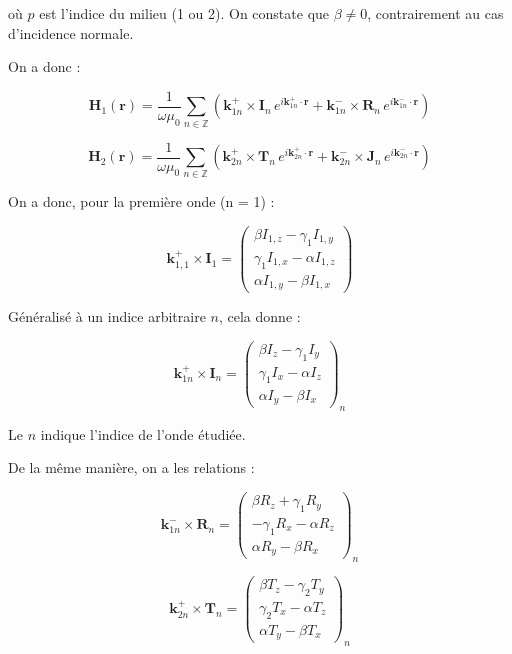 \documentclass{article}
\begin{document}
où $p$ est l'indice du milieu (1 ou 2). On constate que $\beta \neq 0$, contrairement au cas d'incidence normale.


On a donc : 

\[
\mathbf{H}_1(\mathbf{r}) = \frac{1}{\omega \mu_0} \sum_{n \in \mathbb{Z}} 
\left( \mathbf{k}_{1n}^{+} \times \mathbf{I}_n \, e^{i \mathbf{k}_{1n}^{+} \cdot \mathbf{r}} + 
       \mathbf{k}_{1n}^{-} \times \mathbf{R}_n \, e^{i \mathbf{k}_{1n}^{-} \cdot \mathbf{r}} \right)
\]

\[
\mathbf{H}_2(\mathbf{r}) = \frac{1}{\omega \mu_0} \sum_{n \in \mathbb{Z}} 
\left( \mathbf{k}_{2n}^{+} \times \mathbf{T}_n \, e^{i \mathbf{k}_{2n}^{+} \cdot \mathbf{r}} + 
       \mathbf{k}_{2n}^{-} \times \mathbf{J}_n \, e^{i \mathbf{k}_{2n}^{-} \cdot \mathbf{r}} \right)
\]

On a donc, pour la première onde (n = 1) :

\[
\mathbf{k}_{1,1}^{+} \times \mathbf{I}_1 =
\begin{pmatrix}
\beta I_{1,z} - \gamma_1 I_{1,y} \\
\gamma_1 I_{1,x} - \alpha I_{1,z} \\
\alpha I_{1,y} - \beta I_{1,x}
\end{pmatrix}
\]

Généralisé à un indice arbitraire \( n \), cela donne :

\[
\mathbf{k}_{1n}^{+} \times \mathbf{I}_n =
\begin{pmatrix}
\beta I_{z} - \gamma_1 I_{y} \\
\gamma_1 I_{x} - \alpha I_{z} \\
\alpha I_{y} - \beta I_{x}
\end{pmatrix}_n
\]

Le \( n \) indique l'indice de l'onde étudiée.

De la même manière, on a les relations :

\[
\mathbf{k}_{1n}^{-} \times \mathbf{R}_n =
\begin{pmatrix}
\beta R_{z} + \gamma_1 R_{y} \\
- \gamma_1 R_{x} - \alpha R_{z} \\
\alpha R_{y} - \beta R_{x}
\end{pmatrix}_n
\]

\[
\mathbf{k}_{2n}^{+} \times \mathbf{T}_n =
\begin{pmatrix}
\beta T_{z} - \gamma_2 T_{y} \\
\gamma_2 T_{x} - \alpha T_{z} \\
\alpha T_{y} - \beta T_{x}
\end{pmatrix}_n
\]
\end{document}
